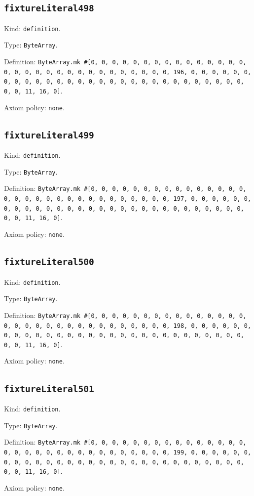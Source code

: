 \documentclass[11pt]{article}
\begin{document}
\subsection*{\texttt{fixtureLiteral498}}
\noindent Kind: \texttt{definition}.\par
\noindent Type: \texttt{ByteArray}.\par
\noindent Definition: \texttt{ByteArray.mk \#[0, 0, 0, 0, 0, 0, 0, 0, 0, 0, 0, 0, 0, 0, 0, 0, 0, 0, 0, 0, 0, 0, 0, 0, 0, 0, 0, 0, 0, 0, 0, 196, 0, 0, 0, 0, 0, 0, 0, 0, 0, 0, 0, 0, 0, 0, 0, 0, 0, 0, 0, 0, 0, 0, 0, 0, 0, 0, 0, 0, 0, 0, 0, 11, 16, 0]}.\par
\noindent Axiom policy: \texttt{none}.\par
\subsection*{\texttt{fixtureLiteral499}}
\noindent Kind: \texttt{definition}.\par
\noindent Type: \texttt{ByteArray}.\par
\noindent Definition: \texttt{ByteArray.mk \#[0, 0, 0, 0, 0, 0, 0, 0, 0, 0, 0, 0, 0, 0, 0, 0, 0, 0, 0, 0, 0, 0, 0, 0, 0, 0, 0, 0, 0, 0, 0, 197, 0, 0, 0, 0, 0, 0, 0, 0, 0, 0, 0, 0, 0, 0, 0, 0, 0, 0, 0, 0, 0, 0, 0, 0, 0, 0, 0, 0, 0, 0, 0, 11, 16, 0]}.\par
\noindent Axiom policy: \texttt{none}.\par
\subsection*{\texttt{fixtureLiteral500}}
\noindent Kind: \texttt{definition}.\par
\noindent Type: \texttt{ByteArray}.\par
\noindent Definition: \texttt{ByteArray.mk \#[0, 0, 0, 0, 0, 0, 0, 0, 0, 0, 0, 0, 0, 0, 0, 0, 0, 0, 0, 0, 0, 0, 0, 0, 0, 0, 0, 0, 0, 0, 0, 198, 0, 0, 0, 0, 0, 0, 0, 0, 0, 0, 0, 0, 0, 0, 0, 0, 0, 0, 0, 0, 0, 0, 0, 0, 0, 0, 0, 0, 0, 0, 0, 11, 16, 0]}.\par
\noindent Axiom policy: \texttt{none}.\par
\subsection*{\texttt{fixtureLiteral501}}
\noindent Kind: \texttt{definition}.\par
\noindent Type: \texttt{ByteArray}.\par
\noindent Definition: \texttt{ByteArray.mk \#[0, 0, 0, 0, 0, 0, 0, 0, 0, 0, 0, 0, 0, 0, 0, 0, 0, 0, 0, 0, 0, 0, 0, 0, 0, 0, 0, 0, 0, 0, 0, 199, 0, 0, 0, 0, 0, 0, 0, 0, 0, 0, 0, 0, 0, 0, 0, 0, 0, 0, 0, 0, 0, 0, 0, 0, 0, 0, 0, 0, 0, 0, 0, 11, 16, 0]}.\par
\noindent Axiom policy: \texttt{none}.\par
\end{document}
